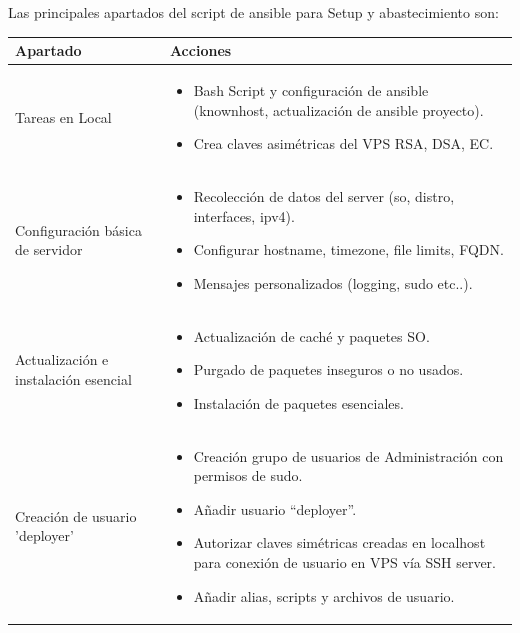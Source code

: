 Las principales apartados del script de ansible para Setup y abastecimiento son:
\begin{longtable}[!ht]{|p{4cm}|p{10cm}|}
    \hline
        \textbf{Apartado} & \textbf{Acciones} \\ \hline
        Tareas en Local &
        \begin{itemize}
            \item  Bash Script y configuración de ansible (knownhost, actualización de ansible proyecto).
            \item  Crea claves asimétricas del VPS RSA, DSA, EC.
        \end{itemize}
        \\ \hline

        Configuración básica de servidor &
        \begin{itemize}
            \item  Recolección de datos del server (so, distro, interfaces, ipv4).  
            \item  Configurar hostname, timezone, file limits,  FQDN. 
            \item  Mensajes personalizados (logging, sudo etc..). 
        \end{itemize}
        \\ \hline

        Actualización e instalación esencial &
        \begin{itemize}
            \item  Actualización de caché y paquetes SO. 
            \item  Purgado de paquetes inseguros o no usados.
            \item  Instalación de paquetes esenciales.
        \end{itemize}
        \\ \hline

         Creación de usuario 'deployer' &
        \begin{itemize}
            \item Creación grupo de usuarios de Administración con permisos de sudo.
            \item Añadir usuario “deployer”.
            \item Autorizar claves simétricas creadas en localhost para conexión de usuario en VPS vía SSH server.
            \item Añadir alias, scripts y archivos de usuario.
        \end{itemize}
        \\ \hline


\end{longtable}

